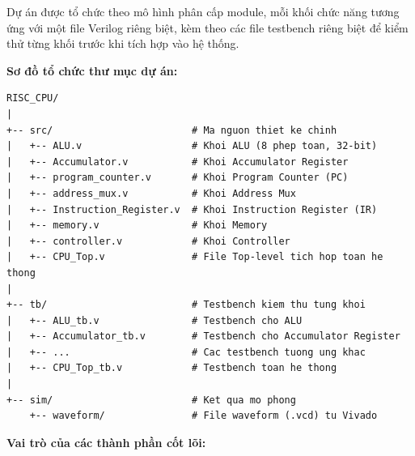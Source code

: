 
Dự án được tổ chức theo mô hình phân cấp module, mỗi khối chức năng tương ứng với một file Verilog riêng biệt, 
kèm theo các file testbench riêng biệt để kiểm thử từng khối trước khi tích hợp vào hệ thống.

\textbf{Sơ đồ tổ chức thư mục dự án:}
\begin{verbatim}
RISC_CPU/
|
+-- src/                        # Ma nguon thiet ke chinh
|   +-- ALU.v                   # Khoi ALU (8 phep toan, 32-bit)
|   +-- Accumulator.v           # Khoi Accumulator Register
|   +-- program_counter.v       # Khoi Program Counter (PC)
|   +-- address_mux.v           # Khoi Address Mux
|   +-- Instruction_Register.v  # Khoi Instruction Register (IR)
|   +-- memory.v                # Khoi Memory 
|   +-- controller.v            # Khoi Controller
|   +-- CPU_Top.v               # File Top-level tich hop toan he thong
|
+-- tb/                         # Testbench kiem thu tung khoi
|   +-- ALU_tb.v                # Testbench cho ALU
|   +-- Accumulator_tb.v        # Testbench cho Accumulator Register
|   +-- ...                     # Cac testbench tuong ung khac
|   +-- CPU_Top_tb.v            # Testbench toan he thong
|
+-- sim/                        # Ket qua mo phong
    +-- waveform/               # File waveform (.vcd) tu Vivado
\end{verbatim}

\textbf{Vai trò của các thành phần cốt lõi:}

